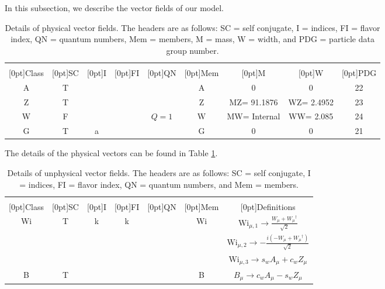 In this subsection, we describe the vector fields of our model.  \begin{table}[!h]
\begin{center}
\begin{tabular}{|c|c|c|c|c|c|c|c|c|}
\hline
 &  &  &  &  &  &  &  & \\
\raisebox{1.5ex}[0pt]{Class} & \raisebox{1.5ex}[0pt]{SC} & \raisebox{1.5ex}[0pt]{I} & \raisebox{1.5ex}[0pt]{FI} & \raisebox{1.5ex}[0pt]{QN} & \raisebox{1.5ex}[0pt]{Mem} & \raisebox{1.5ex}[0pt]{M} & \raisebox{1.5ex}[0pt]{W} & \raisebox{1.5ex}[0pt]{PDG}\\
\hline\hline
A & T & {} & {} & & A & 0 & 0 & 22\\
Z & T & {} & {} & & Z & {MZ= 91.1876} & {WZ= 2.4952} & 23\\
W & F & {} & {} & $Q = 1$ & W & {MW= Internal} & {WW= 2.085} & 24\\
G & T & {a} & {} & & G & 0 & 0 & 21\\
\hline
\end{tabular}
\caption[Physical Vector Fields]{\label{tab:vectors:physical:1}Details of physical vector fields.  The headers are as follows:  SC = self conjugate, I = indices, FI = flavor index, QN = quantum numbers, Mem = members, M = mass, W = width, and PDG = particle data group number.}
\end{center}
\end{table}
The details of the physical vectors can be found in Table \ref{tab:vectors:physical:1}.  \begin{table}[!h]
\begin{center}
\begin{tabular}{|c|c|c|c|c|c|c|}
\hline
 &  &  &  &  &  & \\
\raisebox{1.5ex}[0pt]{Class} & \raisebox{1.5ex}[0pt]{SC} & \raisebox{1.5ex}[0pt]{I} & \raisebox{1.5ex}[0pt]{FI} & \raisebox{1.5ex}[0pt]{QN} & \raisebox{1.5ex}[0pt]{Mem} & \raisebox{1.5ex}[0pt]{Definitions}\\
\hline\hline
Wi & T & {k} & {k} & & Wi & $\text{Wi}{}_{\mu ,1}\to \frac{W{}_{\mu }+W{}_{\mu }{}^{\dagger }}{\sqrt{2}}$\\
 &  & &  & &  & $\text{Wi}{}_{\mu ,2}\to -\frac{i \left(-W{}_{\mu }+W{}_{\mu }{}^{\dagger }\right)}{\sqrt{2}}$\\
 &  & &  & &  & $\text{Wi}{}_{\mu ,3}\to s{}_w A{}_{\mu }+c{}_w Z{}_{\mu }$\\
B & T & {} & {} & & B & $B{}_{\mu }\to c{}_w A{}_{\mu }-s{}_w Z{}_{\mu }$\\
\hline
\end{tabular}
\caption[Unphysical Vector Fields]{\label{tab:vectors:unphysical:1}Details of unphysical vector fields.  The headers are as follows:  SC = self conjugate, I = indices, FI = flavor index, QN = quantum numbers, and Mem = members.}
\end{center}
\end{table}

